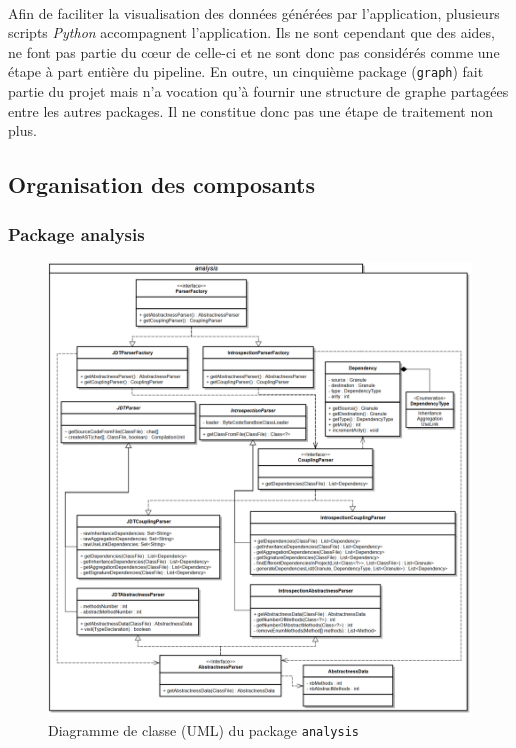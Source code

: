 \documentclass{scrartcl}
\begin{document}
    \paragraph{}Afin de faciliter la visualisation des données générées par l'application, plusieurs scripts \textit{Python} accompagnent l'application. Ils ne sont cependant que des aides, ne font pas partie du cœur de celle-ci et ne sont donc pas considérés comme une étape à part entière du pipeline. En outre, un cinquième package (\texttt{graph}) fait partie du projet mais n'a vocation qu'à fournir une structure de graphe partagées entre les autres packages. Il ne constitue donc pas une étape de traitement non plus.

\subsection{Organisation des composants}

\subsubsection{Package analysis}

    \begin{figure}[ht!]
        \centering
        \includegraphics[width=\textwidth]{img/uml/analysis.png}
        \caption{Diagramme de classe (UML) du package \texttt{analysis}}
    \end{figure}
\end{document}
